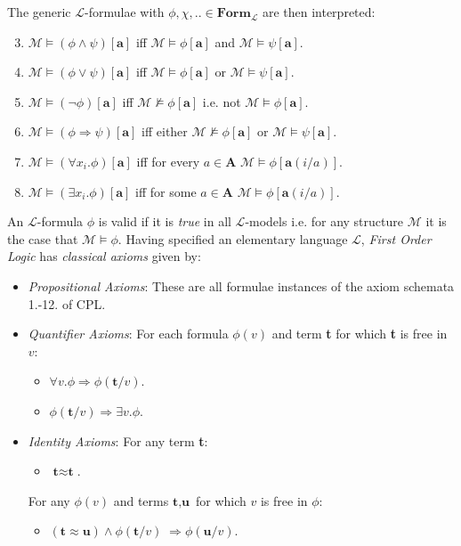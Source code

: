 The generic $\mathcal{L}$-formulae with $\phi,\chi,..\in \textbf{Form}_\mathcal{L}$ are then interpreted:
\begin{enumerate}
	\setcounter{enumi}{2}
	\item $\mathcal{M} \vDash (\phi \land \psi)[\textbf{a}]$ iff $\mathcal{M} \vDash \phi [\textbf{a}]$ and $\mathcal{M} \vDash \psi[\textbf{a}]$.
	\item $\mathcal{M} \vDash (\phi \lor \psi)[\textbf{a}]$ iff $\mathcal{M} \vDash \phi [\textbf{a}]$ or $\mathcal{M} \vDash \psi[\textbf{a}]$.
	\item $\mathcal{M} \vDash (\neg \phi)[\textbf{a}]$ iff $\mathcal{M} \nvDash \phi [\textbf{a}]$ i.e. not $\mathcal{M} \vDash \phi [\textbf{a}]$.
	\item $\mathcal{M} \vDash (\phi \Rightarrow \psi)[\textbf{a}]$ iff either $\mathcal{M} \nvDash \phi [\textbf{a}]$ or $\mathcal{M} \vDash \psi[\textbf{a}]$.
	\item $\mathcal{M} \vDash (\forall x_i.\phi)[\textbf{a}]$ iff for every $a \in \textbf{A}$ $\mathcal{M} \vDash \phi [\textbf{a}(i/a)]$.
	\item $\mathcal{M} \vDash (\exists x_i.\phi)[\textbf{a}]$ iff for some $a \in \textbf{A}$ $\mathcal{M} \vDash \phi [\textbf{a}(i/a)]$.
\end{enumerate}

An $\mathcal{L}$-formula $\phi$ is valid if it is \emph{true} in all $\mathcal{L}$-models i.e. for any structure $\mathcal{M}$ it is the case that $\mathcal{M} \vDash \phi$. 
\newline
Having specified an elementary language $\mathcal{L}$, \emph{First Order Logic} has \emph{classical axioms} given by:

\begin{itemize}
	\item \emph{Propositional Axioms}: These are all formulae instances of the axiom schemata 1.-12. of CPL.
	\item  \emph{Quantifier Axioms}: For each formula $\phi(v)$ and term \textbf{t} for which \textbf{t} is free in $v$:
	\begin{itemize}
			\item $\forall v.\phi \Rightarrow \phi(\textbf{t}/v)$.
			\item  $\phi(\textbf{t}/v) \Rightarrow \exists v.\phi$.
		\end{itemize}
	\item \emph{Identity Axioms}: For any term \textbf{t}:
	\begin{itemize}
			\item $\textbf{t}\approx \textbf{t}$.
		\end{itemize}
	
	For any $\phi(v)$ and terms $\textbf{t}, \textbf{u}$ for which $v$ is free in $\phi$:
	\begin{itemize}
			\item $(\textbf{t} \approx \textbf{u}) \land \phi(\textbf{t}/v) \; \Rightarrow \phi(\textbf{u}/v)$.
		\end{itemize}			
\end{itemize} 

